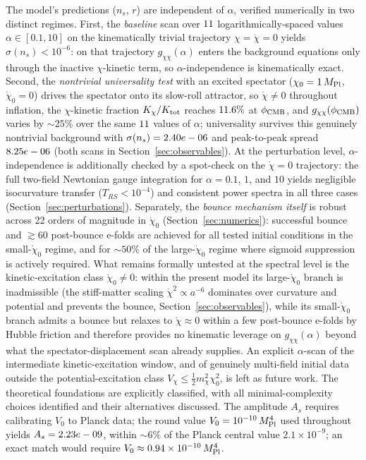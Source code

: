 \documentclass[11pt,a4paper]{article}
\begin{document}
The model's predictions ($n_s$, $r$) are independent of $\alpha$, verified numerically in two distinct regimes. First, the \emph{baseline} scan over $11$ logarithmically-spaced values $\alpha \in [0.1, 10]$ on the kinematically trivial trajectory $\chi = \dot\chi = 0$ yields $\sigma(n_s) < 10^{-6}$: on that trajectory $g_{\chi\chi}(\alpha)$ enters the background equations only through the inactive $\chi$-kinetic term, so $\alpha$-independence is kinematically exact. Second, the \emph{nontrivial universality test} with an excited spectator ($\chi_0 = 1\,M_{\rm Pl}$, $\dot\chi_0 = 0$) drives the spectator onto its slow-roll attractor, so $\dot\chi \neq 0$ throughout inflation, the $\chi$-kinetic fraction $K_\chi/K_{\rm tot}$ reaches $11.6\%$ at $\phi_{\rm CMB}$, and $g_{\chi\chi}(\phi_{\rm CMB})$ varies by $\sim\!25\%$ over the same $11$ values of $\alpha$; universality survives this genuinely nontrivial background with $\sigma(n_s) = 2.40e-06$ and peak-to-peak spread $8.25e-06$ (both scans in Section~\ref{sec:observables}). At the perturbation level, $\alpha$-independence is additionally checked by a spot-check on the $\dot\chi = 0$ trajectory: the full two-field Newtonian gauge integration for $\alpha = 0.1$, $1$, and $10$ yields negligible isocurvature transfer ($T_{RS} < 10^{-4}$) and consistent power spectra in all three cases (Section~\ref{sec:perturbations}). Separately, the \emph{bounce mechanism itself} is robust across 22 orders of magnitude in $\dot\chi_0$ (Section~\ref{sec:numerics}): successful bounce and $\gtrsim 60$ post-bounce e-folds are achieved for all tested initial conditions in the small-$\dot\chi_0$ regime, and for $\sim 50\%$ of the large-$\dot\chi_0$ regime where sigmoid suppression is actively required. What remains formally untested at the spectral level is the kinetic-excitation class $\dot\chi_0 \neq 0$: within the present model its large-$\dot\chi_0$ branch is inadmissible (the stiff-matter scaling $\dot\chi^2 \propto a^{-6}$ dominates over curvature and potential and prevents the bounce, Section~\ref{sec:observables}), while its small-$\dot\chi_0$ branch admits a bounce but relaxes to $\dot\chi \approx 0$ within a few post-bounce e-folds by Hubble friction and therefore provides no kinematic leverage on $g_{\chi\chi}(\alpha)$ beyond what the spectator-displacement scan already supplies. An explicit $\alpha$-scan of the intermediate kinetic-excitation window, and of genuinely multi-field initial data outside the potential-excitation class $V_\chi \leq \tfrac{1}{2}m_\chi^2\chi_0^2$, is left as future work. The theoretical foundations are explicitly classified, with all minimal-complexity choices identified and their alternatives discussed. The amplitude $A_s$ requires calibrating $V_0$ to Planck data; the round value $V_0 = 10^{-10}\,M_{\rm Pl}^4$ used throughout yields $A_s = 2.23e-09$, within $\sim 6\%$ of the Planck central value $2.1 \times 10^{-9}$; an exact match would require $V_0 \approx 0.94 \times 10^{-10}\,M_{\rm Pl}^4$.
\end{document}
